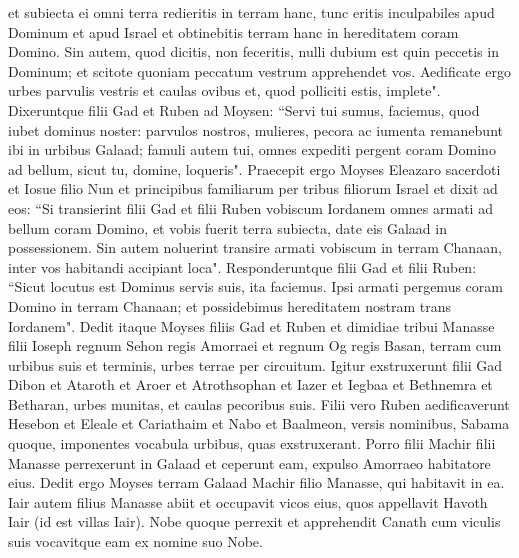 \begin{biblechapter}
\verse et subiecta ei omni terra redieritis in terram hanc, tunc eritis inculpabiles apud Dominum et apud Israel et obtinebitis terram hanc in hereditatem coram Domino. 
\verse Sin autem, quod dicitis, non feceritis, nulli dubium est quin peccetis in Dominum; et scitote quoniam peccatum vestrum apprehendet vos. 
\verse Aedificate ergo urbes parvulis vestris et caulas ovibus et, quod polliciti estis, implete". 
\verse Dixeruntque filii Gad et Ruben ad Moysen: “Servi tui sumus, faciemus, quod iubet dominus noster: 
\verse parvulos nostros, mulieres, pecora ac iumenta remanebunt ibi in urbibus Galaad; 
\verse famuli autem tui, omnes expediti pergent coram Domino ad bellum, sicut tu, domine, loqueris". 
\verse Praecepit ergo Moyses Eleazaro sacerdoti et Iosue filio Nun et principibus familiarum per tribus filiorum Israel et dixit ad eos: 
\verse “Si transierint filii Gad et filii Ruben vobiscum Iordanem omnes armati ad bellum coram Domino, et vobis fuerit terra subiecta, date eis Galaad in possessionem. 
\verse Sin autem noluerint transire armati vobiscum in terram Chanaan, inter vos habitandi accipiant loca". 
\verse Responderuntque filii Gad et filii Ruben: “Sicut locutus est Dominus servis suis, ita faciemus. 
\verse Ipsi armati pergemus coram Domino in terram Chanaan; et possidebimus hereditatem nostram trans Iordanem". 
\verse Dedit itaque Moyses filiis Gad et Ruben et dimidiae tribui Manasse filii Ioseph regnum Sehon regis Amorraei et regnum Og regis Basan, terram cum urbibus suis et terminis, urbes terrae per circuitum. 
\verse Igitur exstruxerunt filii Gad Dibon et Ataroth et Aroer 
\verse et Atrothsophan et Iazer et Iegbaa 
\verse et Bethnemra et Betharan, urbes munitas, et caulas pecoribus suis. 
\verse Filii vero Ruben aedificaverunt Hesebon et Eleale et Cariathaim 
\verse et Nabo et Baalmeon, versis nominibus, Sabama quoque, imponentes vocabula urbibus, quas exstruxerant. 
\verse Porro filii Machir filii Manasse perrexerunt in Galaad et ceperunt eam, expulso Amorraeo habitatore eius. 
\verse Dedit ergo Moyses terram Galaad Machir filio Manasse, qui habitavit in ea. 
\verse Iair autem filius Manasse abiit et occupavit vicos eius, quos appellavit Havoth Iair (id est villas Iair). 
\verse Nobe quoque perrexit et apprehendit Canath cum viculis suis vocavitque eam ex nomine suo Nobe. 
\end{biblechapter}

